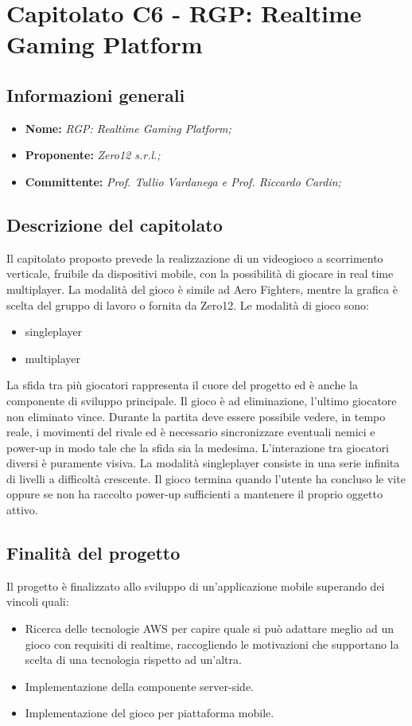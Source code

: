 \section{Capitolato C6 - RGP: Realtime Gaming Platform}
\subsection{Informazioni generali}
	\begin{itemize}
	\item \textbf{Nome:} \textit{RGP: Realtime Gaming Platform;}
	\item \textbf{Proponente:} \textit{Zero12 s.r.l.;}
	\item \textbf{Committente:}  \textit{Prof. Tullio Vardanega e Prof. Riccardo Cardin;}
	\end{itemize}
\subsection{Descrizione del capitolato}
Il capitolato proposto prevede la realizzazione di un videogioco a scorrimento verticale, fruibile da dispositivi mobile, con la possibilità di giocare in real time multiplayer.
La modalità del gioco è simile ad Aero Fighters, mentre la grafica è scelta del gruppo di lavoro o fornita da Zero12.
Le modalità di gioco sono:
\begin{itemize}
	\item singleplayer
	\item multiplayer
\end{itemize}
La sfida tra più giocatori rappresenta il cuore del progetto ed è anche la componente di sviluppo principale.
Il gioco è ad eliminazione, l'ultimo giocatore non eliminato vince.
Durante la partita deve essere possibile vedere, in tempo reale, i movimenti del rivale ed è necessario sincronizzare eventuali nemici e power-up in modo tale che la sfida sia la medesima.
L'interazione tra giocatori diversi è puramente visiva.
La modalità singleplayer consiste in una serie infinita di livelli a difficoltà crescente. Il gioco termina quando l'utente ha concluso le vite oppure se non ha raccolto power-up sufficienti a mantenere il proprio oggetto attivo.

\subsection{Finalità del progetto}
Il progetto è finalizzato allo sviluppo di un'applicazione mobile superando dei vincoli quali:
\begin{itemize}
	\item Ricerca delle tecnologie AWS per capire quale si può adattare meglio ad un gioco con requisiti di realtime, raccogliendo le motivazioni che supportano la scelta di una tecnologia rispetto ad un'altra.
	\item Implementazione della componente server-side.
	\item Implementazione del gioco per piattaforma mobile.
\end{itemize}
